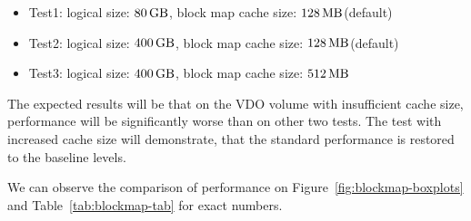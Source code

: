 \documentclass[
  color, %
  table, %
  lof,   %
  lot,   %
]{fithesis3}
\begin{document}




\begin{itemize}
    \item Test1: logical size: $\SI{80}{\giga\byte}$, block map cache size: $\SI{128}{\mega\byte}$(default)
    \item Test2: logical size: $\SI{400}{\giga\byte}$, block map cache size: $\SI{128}{\mega\byte}$(default)
    \item Test3: logical size: $\SI{400}{\giga\byte}$, block map cache size: $\SI{512}{\mega\byte}$ 
\end{itemize}

The expected results will be that on the VDO volume with insufficient cache size, performance will be significantly worse than on other two tests. The test with increased cache size will demonstrate, that the standard performance is restored to the baseline levels.

We can observe the comparison of performance on Figure~\ref{fig:blockmap-boxplots} and Table~\ref{tab:blockmap-tab} for exact numbers.
\end{document}
